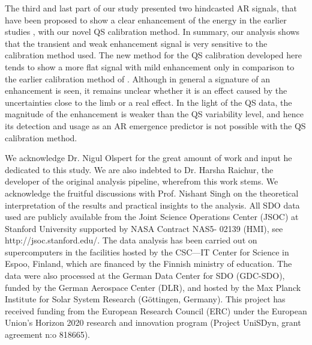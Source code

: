 \documentclass{aa}
\begin{document}
The third and last part of our study presented two hindcasted 
AR \fff signals, that have been proposed to show a clear enhancement of the \fff energy in the earlier studies \citep[][]{SRB16,Waidele22}, with our novel QS calibration method. In summary, our analysis shows that the transient
and weak enhancement signal is very sensitive to the calibration
method used. The new method for the QS calibration developed here tends to show a more flat signal with mild enhancement only in comparison to the earlier calibration method of \cite{SRB16}. Although in general a signature of an enhancement is seen, it remains unclear whether it is an effect caused by the uncertainties close to the limb or a real effect. In the light of the QS data, the magnitude of the enhancement is weaker than the QS variability level, and hence its detection and usage as an AR emergence predictor is not possible with the QS calibration method.



\begin{acknowledgements}
We acknowledge Dr. Nigul Olspert for the great amount of work and input he dedicated to this study. We are also indebted to Dr. Harsha Raichur, the developer of the original \fff analysis pipeline, wherefrom this work stems. We acknowledge the fruitful discussions with Prof. Nishant Singh on the theoretical interpretation of the results and practical insights to the analysis.
All SDO data used are publicly available from the Joint Science Operations Center (JSOC) at Stanford University supported by NASA Contract NAS5- 02139 (HMI), see http://jsoc.stanford.edu/. 
The data analysis has been carried out on supercomputers in the facilities hosted by the CSC---IT
Center for Science in Espoo, Finland, which are financed by the
Finnish ministry of education.
The data were also
processed at the German Data Center for SDO (GDC-SDO), funded by the
German Aerospace Center (DLR), and hosted by the Max Planck Institute for Solar System Research (Göttingen, Germany).
This project has received funding from the European Research Council (ERC)
under the European Union's Horizon 2020 research and innovation
program (Project UniSDyn, grant agreement n:o 818665).

\end{acknowledgements}

{}

\end{document}
